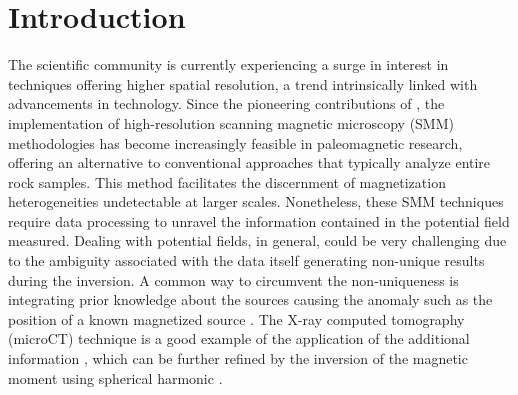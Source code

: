 \section{Introduction}

The scientific community is currently experiencing a surge in interest in techniques offering higher spatial resolution, a trend intrinsically linked with advancements in technology. Since the pioneering contributions of \citet{Egli2000}, the implementation of high-resolution scanning magnetic microscopy (SMM) methodologies has become increasingly feasible in paleomagnetic research, offering an alternative to conventional approaches that typically analyze entire rock samples. This method facilitates the discernment of magnetization heterogeneities undetectable at larger scales. Nonetheless, these SMM techniques require data processing to unravel the information contained in the potential field measured. Dealing with potential fields, in general, could be very challenging due to the ambiguity associated with the data itself generating non-unique results during the inversion. A common way to circumvent the non-uniqueness is integrating prior knowledge about the sources causing the anomaly such as the position of a known magnetized source \citep{Fabian2019}. The X-ray computed tomography (microCT) technique is a good example of the application of the additional information \citep[\textit{e.g.}][]{DeGroot2018, DeGroot2021, Koster2023}, which can be further refined by the inversion of the magnetic moment using spherical harmonic \citep[\textit{e.g.}][]{CortesOrtuno2021, CortesOrtuno2022}.

